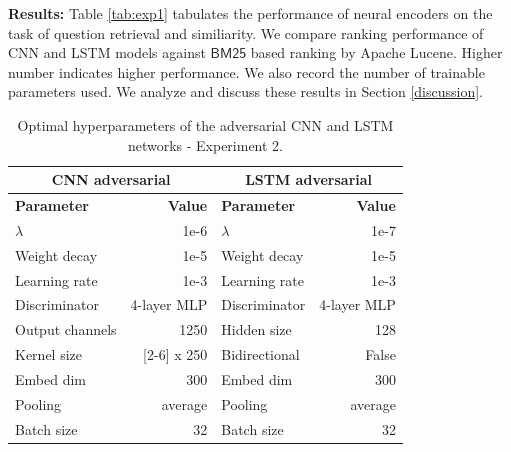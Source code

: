 \documentclass{sigkddExp}
\begin{document}
\textbf{Results:}
Table \ref{tab:exp1} tabulates the performance of neural encoders on the task of question retrieval and similiarity. We compare ranking performance of CNN and LSTM models against $\textsf{BM25}$ based ranking by Apache Lucene. Higher number indicates higher performance. We also record the number of trainable parameters used. We analyze and discuss these results in Section \ref{discussion}.
\begin{table}[h]
    \begin{tabular}{l|r|l|r}
          \multicolumn{2}{c|}{\textbf{CNN adversarial}}
         & \multicolumn{2}{c}{\textbf{LSTM adversarial}}
         \\
         \toprule
         \textbf{Parameter}
         & \textbf{Value}
         & \textbf{Parameter}
         & \textbf{Value}
         \\
         \midrule
         $\lambda$
         & 1e-6
         & $\lambda$
         & 1e-7
         \\
          Weight decay
         & 1e-5 
         & Weight decay
         & 1e-5 
         \\
         Learning rate
         & 1e-3
         & Learning rate
         & 1e-3
         \\
         Discriminator
         & 4-layer MLP
         & Discriminator
         & 4-layer MLP
         \\
         Output channels
         & 1250
         & Hidden size
         & 128
         \\
         Kernel size
         & [2-6] x 250
         & Bidirectional
         & False
         \\
         Embed dim
         & 300
         & Embed dim
         & 300
         \\
         Pooling
         & average
         & Pooling
         & average
         \\
         Batch size
         & 32
         & Batch size
         & 32
    \end{tabular}
    \caption{Optimal hyperparameters of the adversarial CNN and LSTM networks - Experiment 2.}
    \label{tab:param_adversarial}
\end{table}
\end{document}
